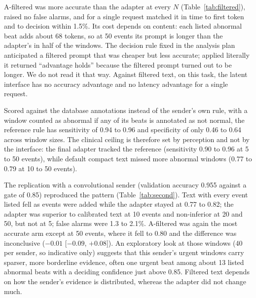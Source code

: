  A-filtered was more accurate than the adapter at every $N$ (Table~\ref{tab:filtered}), raised no false alarms, and for a single request matched it in time to first token and to decision within 1.5\%. Its cost depends on content: each listed abnormal beat adds about 68 tokens, so at 50 events its prompt is longer than the adapter's in half of the windows. The decision rule fixed in the analysis plan anticipated a filtered prompt that was cheaper but less accurate; applied literally it returned ``advantage holds'' because the filtered prompt turned out to be longer. We do not read it that way. Against filtered text, on this task, the latent interface has no accuracy advantage and no latency advantage for a single request.

\begin{table}[t]
\caption{Adapter against filtered text (default decoding) with patient-cluster intervals, and median prompt tokens (adapter / filtered).}
\label{tab:filtered}
\centering
\small

\end{table}

 Scored against the database annotations instead of the sender's own rule, with a window counted as abnormal if any of its beats is annotated as not normal, the reference rule has sensitivity of 0.94 to 0.96 and specificity of only 0.46 to 0.64 across window sizes. The clinical ceiling is therefore set by perception and not by the interface: the final adapter tracked the reference (sensitivity 0.90 to 0.96 at 5 to 50 events), while default compact text missed more abnormal windows (0.77 to 0.79 at 10 to 50 events).

 The replication with a convolutional sender (validation accuracy 0.955 against a gate of 0.85) reproduced the pattern (Table~\ref{tab:second}). Text with every event listed fell as events were added while the adapter stayed at 0.77 to 0.82; the adapter was superior to calibrated text at 10 events and non-inferior at 20 and 50, but not at 5; false alarms were 1.3 to 2.1\%. A-filtered was again the most accurate arm except at 50 events, where it fell to 0.80 and the difference was inconclusive ($-0.01$ [$-0.09$, $+0.08$]). An exploratory look at those windows (40 per sender, so indicative only) suggests that this sender's urgent windows carry sparser, more borderline evidence, often one urgent beat among about 13 listed abnormal beats with a deciding confidence just above 0.85. Filtered text depends on how the sender's evidence is distributed, whereas the adapter did not change much.

